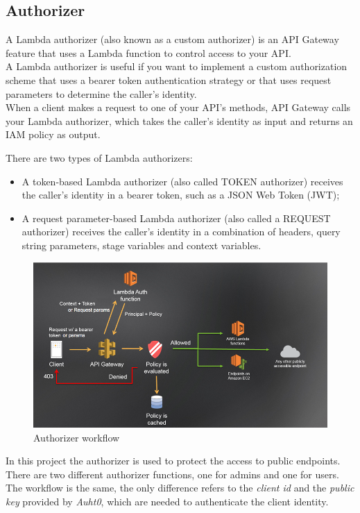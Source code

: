 \subsection{Authorizer}
A Lambda authorizer (also known as a custom authorizer) is an API Gateway feature that uses a Lambda function to control access to your API.\\
A Lambda authorizer is useful if you want to implement a custom authorization scheme that uses a bearer token authentication strategy or that uses request parameters to determine the caller's identity.\\
When a client makes a request to one of your API's methods, API Gateway calls your Lambda authorizer, which takes the caller's identity as input and returns an IAM policy as output.

There are two types of Lambda authorizers:
\begin{itemize}
	\item A token-based Lambda authorizer (also called TOKEN authorizer) receives the caller's identity in a bearer token, such as a JSON Web Token (JWT);

	\item A request parameter-based Lambda authorizer (also called a REQUEST authorizer) receives the caller's identity in a combination of headers, query string parameters, stage variables and context variables.
\end{itemize}
\begin{figure} [H]
	\centering
	\includegraphics[scale=0.6]{../Img/authorizer}
	\caption{Authorizer workflow}\label{}
\end{figure}

In this project the authorizer is used to protect the access to public endpoints. There are two different authorizer functions, one for admins and one for users. The workflow is the same, the only difference refers to the \emph{client id} and the \emph{public key} provided by \emph{Auht0}, which are needed to authenticate the client identity.


